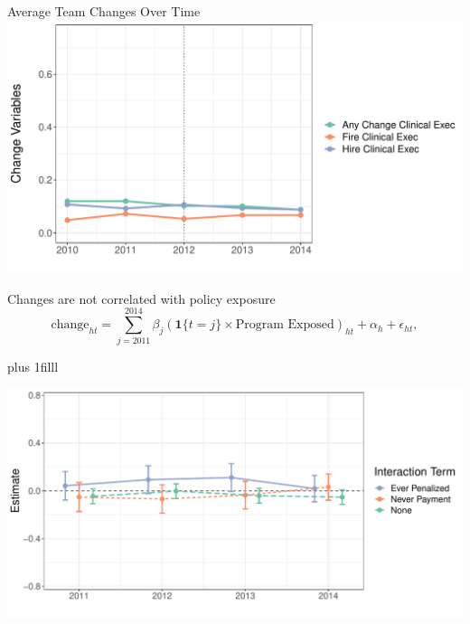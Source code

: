 \documentclass[notes,11pt, aspectratio=169]{beamer}
\newcommand{\btVFill}{\vskip0pt plus 1filll}
\begin{document}
\begin{frame}{Average Team Changes Over Time}
\centering 
    \includegraphics[width=.8\textwidth]{Objects/change_means.pdf}
\end{frame}

\begin{frame}{Changes are not correlated with policy exposure}
\centering \small
\begin{equation*}\label{eq:change2}
    \text{change}_{ht} = \sum_{j=2011}^{2014}\beta_j(\mathbf{1}\{t=j\}\times \text{Program Exposed})_{ht} + \alpha_h + \epsilon_{ht},
    \end{equation*}

    \btVFill

    \includegraphics[width=.7\textwidth]{Objects/change_analysis_plot.pdf}
    
\end{frame}
\end{document}
